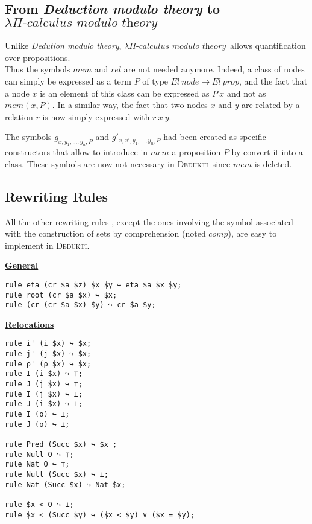 \documentclass[submission,copyright,creativecommons]{eptcs}
\def\ra{\rightarrow}
\newcommand{\dedukti}{\textsc{Dedukti}}
\newcommand{\lpcm}{$\lambda \Pi\textit{-calculus modulo theory}$}
\begin{document}
\subsection{From \textit{Deduction modulo theory} to \lpcm}

Unlike \textit{Dedution modulo theory}, \lpcm ~allows quantification over propositions. \\

Thus the symbols $mem$ and $rel$ \cite[see Table 2]{zermodulo} are not needed anymore. Indeed, a class of nodes can simply be expressed as a term $P$ of type $El~node \ra El~prop$, and the fact that a node $x$ is an element of this class can be expressed as $P~x$ and not as $mem(x,P)$. In a similar way, the fact that two nodes $x$ and $y$ are related by a relation $r$ is now simply expressed with $r~x~y$.

The symbols $g_{x,y_1,...,y_n,P}$ and $g'_{x,x',y_1,...,y_n,P}$ had been created as specific constructors that allow to introduce in $mem$ a proposition $P$ by convert it into a class. These symbols are now not necessary in \dedukti ~since $mem$ is deleted. 


\subsection{Rewriting Rules}

All the other rewriting rules \cite[see Table 3]{zermodulo}, except the ones involving the symbol associated with the construction of sets by comprehension (noted $comp$), are easy to implement in \dedukti.

\begin{center}
\underline{\textbf{General}}
\end{center}

\begin{lstlisting}
rule eta (cr $a $z) $x $y ↪ eta $a $x $y;
rule root (cr $a $x) ↪ $x;
rule (cr (cr $a $x) $y) ↪ cr $a $y;
\end{lstlisting}

\begin{center}
\underline{\textbf{Relocations}}
\end{center}

\begin{lstlisting}
rule i' (i $x) ↪ $x;
rule j' (j $x) ↪ $x;
rule ρ' (ρ $x) ↪ $x;
rule I (i $x) ↪ ⊤;
rule J (j $x) ↪ ⊤;
rule I (j $x) ↪ ⊥;
rule J (i $x) ↪ ⊥;
rule I (o) ↪ ⊥;
rule J (o) ↪ ⊥;

rule Pred (Succ $x) ↪ $x ;
rule Null O ↪ ⊤;
rule Nat O ↪ ⊤;
rule Null (Succ $x) ↪ ⊥;
rule Nat (Succ $x) ↪ Nat $x;

rule $x < O ↪ ⊥;
rule $x < (Succ $y) ↪ ($x < $y) ∨ ($x = $y);
\end{lstlisting}
\end{document}
